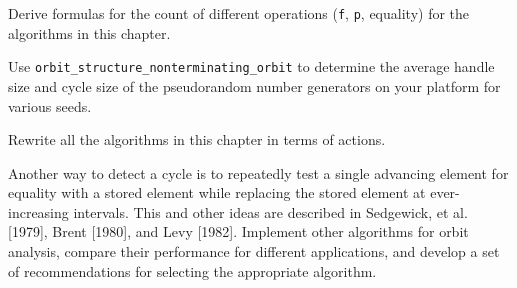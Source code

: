 

\begin{exercise}
	Derive formulas for the count of different operations (\verb|f|, \verb|p|, equality) for
	the algorithms in this chapter.
\end{exercise}

\begin{exercise}
	Use \verb|orbit_structure_nonterminating_orbit| to determine the average handle size and
	cycle size of the pseudorandom number generators on your platform for various seeds.
\end{exercise}

\begin{exercise}
	Rewrite all the algorithms in this chapter in terms of actions.
\end{exercise}

\begin{project}
	Another way to detect a cycle is to repeatedly test a single advancing element for
	equality with a stored element while replacing the stored element at ever-increasing
	intervals. This and other ideas are described in Sedgewick, et al. [1979], Brent [1980],
	and Levy [1982]. Implement other algorithms for orbit analysis, compare their
	performance for different applications, and develop a set of recommendations for
	selecting the appropriate algorithm.
\end{project}
